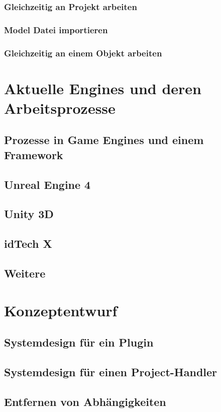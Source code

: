 \documentclass[pagesize, paper=a4, fontsize=12pt,titlepage=true, headings=small, headnosepline, abstractoff, liststotoc, nochapterprefix, plainheadsepline, twoside]{scrreprt}
\begin{document}
\subsubsection{Gleichzeitig an Projekt arbeiten}
\subsubsection{Model Datei importieren}
\subsubsection{Gleichzeitig an einem Objekt arbeiten}

\section{Aktuelle Engines und deren Arbeitsprozesse}
\subsection{Prozesse in Game Engines und einem Framework}
\subsection{Unreal Engine 4}
\subsection{Unity 3D}
\subsection{idTech X}
\subsection{Weitere}

\section{Konzeptentwurf}
\subsection{Systemdesign für ein Plugin}
\subsection{Systemdesign für einen Project-Handler}
\subsection{Entfernen von Abhängigkeiten}
\end{document}

